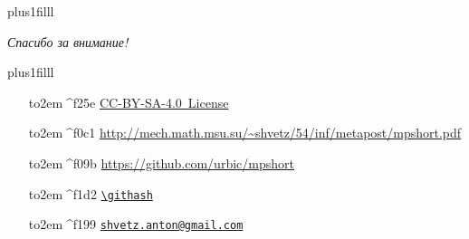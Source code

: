\begin{frame}

\vskip0pt plus1filll

{\Huge\itshape
Спасибо за внимание!}

\vskip0pt plus1filll

\begin{itemize}
\tiny
\item[\hbox to2em{\hfil{\fontspec{FontAwesome}^^^^f25e}\hfil}]
\href{https://creativecommons.org/licenses/by-sa/4.0/deed.ru}
{{CC-BY-SA-4.0 License}}
\item[\hbox to2em{\hfil{\fontspec{FontAwesome}^^^^f0c1}\hfil}]
\url{http://mech.math.msu.su/~shvetz/54/inf/metapost/mpshort.pdf}
\item[\hbox to2em{\hfil{\fontspec{FontAwesome}^^^^f09b}\hfil}]
\url{https://github.com/urbic/mpshort}
\item[\hbox to2em{\hfil{\fontspec{FontAwesome}^^^^f1d2}\hfil}]
\expandafter\href{https://github.com/urbic/mpshort/commit/\githash}{\nolinkurl{\githash}}
\item[\hbox to2em{\hfil{\fontspec{FontAwesome}^^^^f199}\hfil}]
\href{mailto:shvetz.anton@gmail.com?subject=mpshort}{\nolinkurl{shvetz.anton@gmail.com}}
\end{itemize}
\vspace{3ex}
\end{frame}
